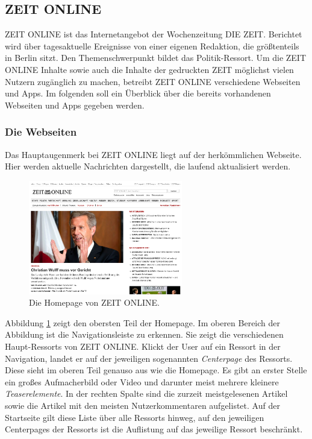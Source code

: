 \documentclass[12pt,a4paper,bibtotoc,abstracton]{scrartcl}
\begin{document}
\subsection{ZEIT ONLINE}
\label{subsec:zeitonline}
ZEIT ONLINE ist das Internetangebot der Wochenzeitung DIE ZEIT. Berichtet wird über tagesaktuelle Ereignisse von einer eigenen Redaktion, die größtenteils in Berlin sitzt. Den Themenschwerpunkt bildet das Politik-Ressort. Um die ZEIT ONLINE Inhalte sowie auch die Inhalte der gedruckten ZEIT möglichst vielen Nutzern zugänglich zu machen, betreibt ZEIT ONLINE verschiedene Webseiten und Apps. Im folgenden soll ein  Überblick über die bereits vorhandenen Webseiten und Apps gegeben werden.

\subsubsection{Die Webseiten}
\label{subsubsec:webseiten}
Das Hauptaugenmerk bei ZEIT ONLINE liegt auf der herkömmlichen Webseite. Hier werden aktuelle Nachrichten dargestellt, die laufend aktualisiert werden.

\begin{figure}[h]	
	\centering
	\includegraphics[width=0.6\textwidth]{Bilder/Screenshots/zeit.de/homepage.png} 
	\caption{Die Homepage von ZEIT ONLINE.}
	\label{fig:homepage}
\end{figure}

Abbildung \ref{fig:homepage} zeigt den obersten Teil der Homepage. Im oberen Bereich der Abbildung ist die Navigationsleiste zu erkennen. Sie zeigt die verschiedenen Haupt-Ressorts von ZEIT ONLINE. Klickt der User auf ein Ressort in der Navigation, landet er auf der jeweiligen sogenannten \textit{Centerpage} des Ressorts. Diese sieht im oberen Teil genauso aus wie die Homepage. Es gibt an erster Stelle ein großes Aufmacherbild oder Video und darunter meist mehrere kleinere \textit{Teaserelemente}. In der rechten Spalte sind die zurzeit meistgelesenen Artikel sowie die Artikel mit den meisten Nutzerkommentaren aufgelistet. Auf der Startseite gilt diese Liste über alle Ressorts hinweg, auf den jeweiligen Centerpages der Ressorts ist die Auflistung auf das jeweilige Ressort beschränkt.
\end{document}
